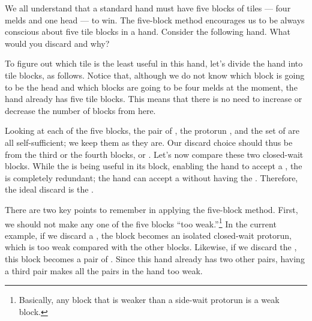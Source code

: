 We all understand that a standard hand
must have five blocks of tiles --- four melds and one head --- to win. 
The five-block method encourages us to be always conscious about five tile blocks in a hand. 
Consider the following hand. What would you discard and why?

\bp
{}\zhong\zhong\zhong
\ep

To figure out which tile is the least useful in this hand, let's divide the hand into tile blocks, as follows. 
\emj
Notice that, although we do not know which block is going to be the head and which blocks are going to be four melds at the moment, the hand already has five tile blocks. This means that there is no need to increase or decrease the number of blocks from here. 

\bigskip
Looking at each of the five blocks, the pair of {\large{}}, the protorun {\large{}}, and the set of {\large\zhong} are all self-sufficient; we keep them as they are. Our discard choice should thus be from the third or the fourth blocks, {\large{}} or {\large{}}. 
Let's now compare these two closed-wait blocks. While the {\large{}} is being useful in its block, enabling the hand to accept a {\large{}}, the {\large{}} is completely redundant; the hand can accept a {\large{}} without having the {\large{}}. Therefore, the ideal discard is the {\large{}}. 

\bigskip
There are two key points to remember in applying the five-block method. 
First, we should not make any one of the five blocks ``too weak.''\footnote{Basically, any block that is weaker than a side-wait protorun is a weak block.} In the current example, if we discard a {\large{}}, the {\large{}} block becomes an isolated closed-wait protorun, which is too weak compared with the other blocks. Likewise, if we discard the {\large{}}, this block becomes a pair of {\large{}}. Since this hand already has two other pairs, having a third pair makes all the pairs in the hand too weak. 

